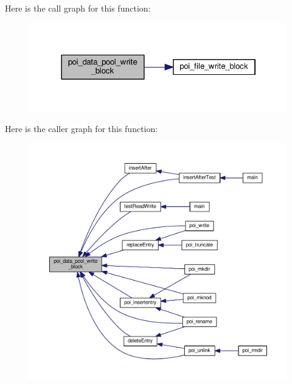 Here is the call graph for this function\-:\nopagebreak
\begin{figure}[H]
\begin{center}
\leavevmode
\includegraphics[width=322pt]{data-pool-block-manager_8c_a10624f1cbc61dd0a8a03aa94d8502567_cgraph}
\end{center}
\end{figure}




Here is the caller graph for this function\-:\nopagebreak
\begin{figure}[H]
\begin{center}
\leavevmode
\includegraphics[width=350pt]{data-pool-block-manager_8c_a10624f1cbc61dd0a8a03aa94d8502567_icgraph}
\end{center}
\end{figure}



